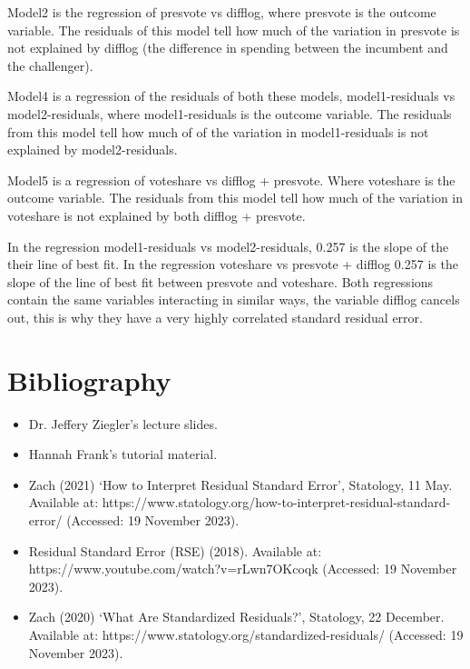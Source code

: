 \documentclass[12pt,letterpaper]{article}
\begin{document}
\begin{enumerate}
		\vspace{0.1cm}
		
		Model2 is the regression of presvote vs difflog, where presvote is the outcome variable. The residuals of this model tell how much of the variation in presvote is not explained by difflog (the difference in spending between the incumbent and the challenger). 
		
		\vspace{0.1cm}
		
		Model4 is a regression of the residuals of both these models, model1-residuals vs model2-residuals, where model1-residuals is the outcome variable. The residuals from this model tell how much of of the variation in model1-residuals is not explained by model2-residuals.
		
		\vspace{0.1cm}
		
		Model5 is a regression of voteshare vs difflog + presvote. Where voteshare is the outcome variable. The residuals from this model tell how much of the variation in voteshare is not explained by both difflog + presvote.
		
		In the regression model1-residuals vs model2-residuals, 0.257 is the slope of the their line of best fit. In the regression voteshare vs presvote + difflog 0.257 is the slope of the line of best fit between presvote and voteshare. Both regressions contain the same variables interacting in similar ways, the variable difflog cancels out, this is why they have a very highly correlated standard residual error. 
	\end{enumerate}

\section*{Bibliography}
\begin{itemize}
	\item Dr. Jeffery Ziegler's lecture slides.
	\item Hannah Frank's tutorial material.
	\item Zach (2021) ‘How to Interpret Residual Standard Error’, Statology, 11 May. Available at: https://www.statology.org/how-to-interpret-residual-standard-error/ (Accessed: 19 November 2023).
	\item Residual Standard Error (RSE) (2018). Available at: https://www.youtube.com/watch?v=rLwn7OKcoqk (Accessed: 19 November 2023).
	\item Zach (2020) ‘What Are Standardized Residuals?’, Statology, 22 December. Available at: https://www.statology.org/standardized-residuals/ (Accessed: 19 November 2023).
	
\end{itemize}
\end{document}
